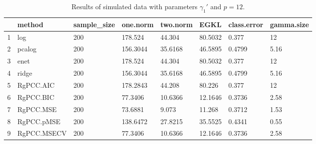 \begin{table}[ht]
\centering
\begin{tabular}{rlllllll}
  \hline
 & method & sample\_size & one.norm & two.norm & EGKL & class.error & gamma.size \\ 
  \hline
1 & log & 200 & 178.524 & 44.304 & 80.5032 & 0.377 & 12 \\ 
  2 & pcalog & 200 & 156.3044 & 35.6168 & 46.5895 & 0.4799 & 5.16 \\ 
  3 & enet & 200 & 178.524 & 44.304 & 80.5032 & 0.377 & 12 \\ 
  4 & ridge & 200 & 156.3044 & 35.6168 & 46.5895 & 0.4799 & 5.16 \\ 
  5 & RgPCC.AIC & 200 & 178.2843 & 44.208 & 80.226 & 0.377 & 12 \\ 
  6 & RgPCC.BIC & 200 & 77.3406 & 10.6366 & 12.1646 & 0.3736 & 2.58 \\ 
  7 & RgPCC.MSE & 200 & 73.6881 & 9.073 & 11.268 & 0.3712 & 1.53 \\ 
  8 & RgPCC.pMSE & 200 & 138.6472 & 27.8215 & 35.5525 & 0.4341 & 0.55 \\ 
  9 & RgPCC.MSECV & 200 & 77.3406 & 10.6366 & 12.1646 & 0.3736 & 2.58 \\ 
   \hline
\end{tabular}
\caption{Results of simulated data with parameters $\gamma_1'$ and $p =12$. } 
\label{fig-1'-nonlead-12-metrics-p}
\end{table}
